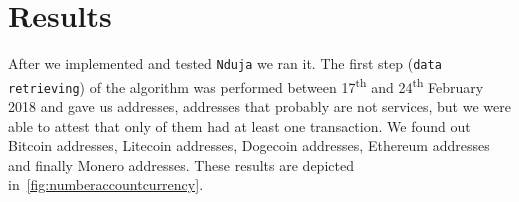 \newcommand{\accountGitlab}{2}

\newcommand{\accountBitbucket}{1}

\newcommand{\facebookRelatedAccounts}{12}
\newcommand{\linkedinRelatedAccount}{30}


\section{Results} \label{results}
After we implemented and tested \texttt{Nduja} we ran it. The first step
(\texttt{data retrieving}) of the algorithm  was performed between
17\textsuperscript{th} and 24\textsuperscript{th} February 2018 and gave us
\startingNumberAllWallets{} addresses, \startingNumberWalletsNotService{}
addresses that probably are not services, but we were able to attest that only
\startingNumberWalletsAtLeastOneTransaction{} of them had at least one
transaction. We found out \startingBTC{} Bitcoin addresses, \startingLTC{}
Litecoin addresses, \startingDOGE{} Dogecoin addresses, \startingETH{} Ethereum
addresses and finally \startingXMR{} Monero addresses. These results are
depicted in~\autoref{fig:numberaccountcurrency}.


